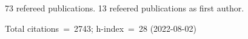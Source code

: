 73 refereed publications. 13 refeered publications as first author.

Total citations~=~2743; h-index~=~28 (2022-08-02)